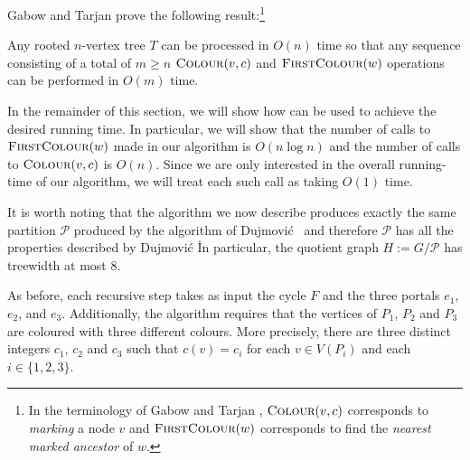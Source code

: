 \documentclass[kpfonts]{patmorin}
\let\ge\geqslant
\begin{document}
Gabow and Tarjan \cite{gabow.tarjan:linear} prove the following result:\footnote{In the terminology of Gabow and Tarjan \cite{gabow.tarjan:linear}, $\textsc{Colour}(v,c)$ corresponds to \emph{marking} a node $v$ and $\textsc{FirstColour}(w)$ corresponds to find the \emph{nearest marked ancestor} of $w$.}
\begin{thm}
 Any rooted $n$-vertex tree $T$ can be processed in $O(n)$ time so that any sequence consisting of a total of $m\ge n$ $\textsc{Colour}(v,c)$ and
 $\textsc{FirstColour}(w)$ operations can be performed in $O(m)$ time.
\end{thm}

In the remainder of this section, we will show how  can be used to achieve the desired running time.  In particular, we will show that the number of calls to $\textsc{FirstColour}(w)$ made in our algorithm is $O(n\log n)$ and the number of calls to $\textsc{Colour}(v,c)$ is $O(n)$.  Since we are only interested in the overall running-time of our algorithm, we will treat each such call as taking $O(1)$ time.

It is worth noting that the algorithm we now describe produces exactly the same partition $\mathcal{P}$ produced by the algorithm of Dujmović \etal\ and therefore $\mathcal{P}$ has all the properties described by Dujmović \etal\.   In particular, the quotient graph $H:=G/\mathcal{P}$ has treewidth at most $8$.

As before, each recursive step takes as input the cycle $F$ and the three portals $e_1$, $e_2$, and $e_3$.  Additionally, the algorithm requires that the vertices of $P_1$, $P_2$ and $P_3$ are coloured with three different colours.  More precisely, there are three distinct integers $c_1$, $c_2$ and $c_3$ such that $c(v)=c_i$ for each $v\in V(P_i)$ and each $i\in\{1,2,3\}$.
\end{document}
